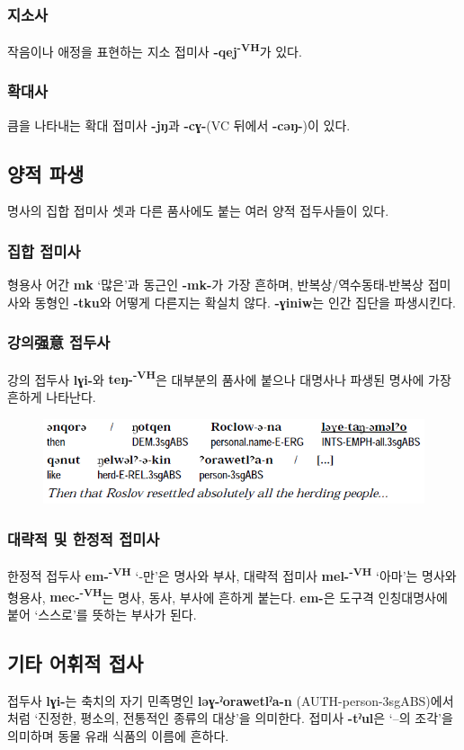 \subsubsection{지소사}
작음이나 애정을 표현하는 지소 접미사 \textbf{-qej\textsuperscript{-VH}}가 있다.
\subsubsection{확대사}
큼을 나타내는 확대 접미사 \textbf{-jŋ}과 \textbf{-cɣ-}(VC 뒤에서 \textbf{-cəŋ-})이 있다.
\subsection{양적 파생}
명사의 집합 접미사 셋과 다른 품사에도 붙는 여러 양적 접두사들이 있다.
\subsubsection{집합 접미사}
형용사 어간 \textbf{mk} `많은'과 동근인 \textbf{-mk-}가 가장 흔하며, 반복상/역수동태-반복상 접미사와 동형인 \textbf{-tku}와 어떻게 다른지는 확실치 않다. \textbf{-ɣiniw}는 인간 집단을 파생시킨다.
\subsubsection{강의强意 접두사}
강의 접두사 \textbf{lɣi-}와 \textbf{teŋ-\textsuperscript{-VH}}은 대부분의 품사에 붙으나 대명사나 파생된 명사에 가장 흔하게 나타난다.
\begin{figure}[H]
\centerline{\includegraphics{Chukchi/src/chin2.png}}
\end{figure}
\subsubsection{대략적 및 한정적 접미사}
한정적 접두사 \textbf{em-\textsuperscript{-VH}} `-만'은 명사와 부사, 대략적 접미사 \textbf{mel-\textsuperscript{-VH}} `아마'는 명사와 형용사, \textbf{mec-\textsuperscript{-VH}}는 명사, 동사, 부사에 흔하게 붙는다. \textbf{em-}은 도구격 인칭대명사에 붙어 `스스로'를 뜻하는 부사가 된다.
\subsection{기타 어휘적 접사}
접두사 \textbf{lɣi-}는 축치의 자기 민족명인 \textbf{ləɣ-ˀorawetlˀa-n} (AUTH-person-3sgABS)에서처럼 `진정한, 평소의, 전통적인 종류의 대상'을 의미한다. 접미사 \textbf{-tˀul}은 `--의 조각'을 의미하며 동물 유래 식품의 이름에 흔하다.

